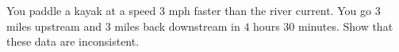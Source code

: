 You paddle a kayak at a speed $3$ mph faster than the river current. You go $3$ miles upstream and $3$ miles back downstream in $4$ hours $30$ minutes. Show that these data are inconsistent.
